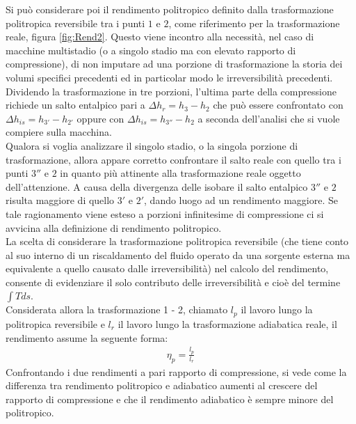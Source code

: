 Si può considerare poi il rendimento politropico definito dalla trasformazione politropica reversibile tra i punti $1$ e $2$, come riferimento per la trasformazione reale, figura \ref{fig:Rend2}. Questo viene incontro alla necessità, nel caso di macchine multistadio (o a singolo stadio ma con elevato rapporto di compressione), di non imputare ad una porzione di trasformazione la storia dei volumi specifici precedenti ed in particolar modo le irreversibilità precedenti.\\
Dividendo la trasformazione in tre porzioni, l'ultima parte della compressione richiede un salto entalpico pari a $\Delta h_r = h_3 - h_2$ che può essere confrontato con $\Delta h_{is} = h_{3'} - h_{2'}$ oppure con $\Delta h_{is} = h_{3''} - h_2$ a seconda dell'analisi che si vuole compiere sulla macchina.\\
Qualora si voglia analizzare il singolo stadio, o la singola porzione di trasformazione, allora appare corretto confrontare il salto reale con quello tra i punti $3''$ e $2$ in quanto più attinente alla trasformazione reale oggetto dell'attenzione. A causa della divergenza delle isobare il salto entalpico $3''$ e $2$ risulta maggiore di quello $3'$ e $2'$, dando luogo ad un rendimento maggiore. Se tale ragionamento viene esteso a porzioni infinitesime di compressione ci si avvicina alla definizione di rendimento politropico.\\
La scelta di considerare la trasformazione politropica reversibile (che tiene conto al suo interno di un riscaldamento del fluido operato da una sorgente esterna ma equivalente a quello causato dalle irreversibilità) nel calcolo del rendimento, consente di evidenziare il solo contributo delle irreversibilità e cioè del termine $\int Tds$.\\
Considerata allora la trasformazione 1 - 2, chiamato $l_p$ il lavoro lungo la politropica reversibile e $l_r$ il lavoro lungo la trasformazione adiabatica reale, il rendimento assume la seguente forma:
\begin{align*}
\eta_p = \frac{l_p}{l_r}
\end{align*}
Confrontando i due rendimenti a pari rapporto di compressione, si vede come la differenza tra rendimento politropico e adiabatico aumenti al crescere del rapporto di compressione e che il rendimento adiabatico è sempre minore del politropico.
